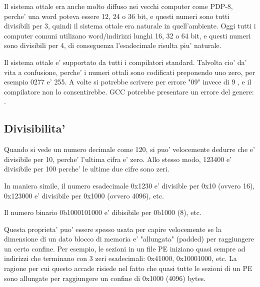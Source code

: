 Il sistema ottale era anche molto diffuso nei vecchi computer come PDP-8, perche' una word poteva essere 12, 24 o 36 bit, e questi numeri sono tutti divisibili per 3, quindi il sistema ottale era naturale in quell'ambiente.
Oggi tutti i computer comuni utilizano word/indirizzi lunghi 16, 32 o 64 bit, e questi numeri sono divisibili per 4, di conseguenza l'esadecimale risulta piu' naturale.

Il sistema ottale e' supportato da tutti i compilatori \CCpp standard.
Talvolta cio' da' vita a confusione, perche' i numeri ottali sono codificati preponendo uno zero, per esempio 0277 e' 255.
A volte si potrebbe scrivere per errore "09" invece di 9 , e il compilatore non lo consentirebbe.
GCC potrebbe presentare un errore del genere: .

\subsection{Divisibilita'}

Quando si vede un numero decimale come 120, si puo' velocemente dedurre che e' divisibile per 10, perche' l'ultima cifra e' zero.
Allo stesso modo, 123400 e' divisibile per 100 perche' le ultime due cifre sono zeri.


In maniera simile, il numero esadecimale 0x1230 e' divisible per 0x10 (ovvero 16), 0x123000 e' divisibile per 0x1000 (ovvero 4096), etc.

Il numero binario 0b1000101000 e' dibisibile per 0b1000 (8), etc.

Questa proprieta' puo' essere spesso usata per capire velocemente se la dimensione di un dato blocco di memoria e' "allungata" (padded) per raggiungere un certo confine.
Per esempio, le sezioni in un file \ac{PE} iniziano quasi sempre ad indirizzi che terminano con 3 zeri esadecimali: 0x41000, 0x10001000, etc.
La ragione per cui questo accade risiede nel fatto che quasi tutte le sezioni di un \ac{PE} sono allungate per raggiungere un confine di 0x1000 (4096) bytes.

